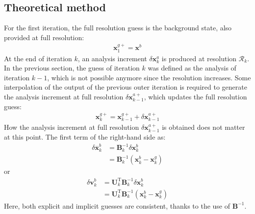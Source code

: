 \documentclass[12pt]{scrartcl}
\begin{document}
\subsection{Theoretical method}
For the first iteration, the full resolution guess is the background state, also provided at full resolution:
\begin{align}
\label{eq:usual_full_res_first}
\mathbf{x}^{g+}_1 = \mathbf{x}^b
\end{align}
At the end of iteration $k$, an analysis increment $\delta \mathbf{x}^a_k$ is produced at resolution $\mathcal{R}_k$. In the previous section, the guess of iteration $k$ was defined as the analysis of iteration $k-1$, which is not possible anymore since the resolution increases. Some interpolation of the output of the previous outer iteration is required to generate the analysis increment at full resolution $\delta \mathbf{x}^{a+}_{k-1}$, which updates the full resolution guess:
\begin{align}
\label{eq:usual_full_res_next}
\mathbf{x}^{g+}_k = \mathbf{x}^{g+}_{k-1} + \delta \mathbf{x}^{a+}_{k-1}
\end{align}
How the analysis increment at full resolution $\delta \mathbf{x}^{a+}_{k-1}$ is obtained does not matter at this point. The first term of the right-hand side as:
\begin{align}
\label{eq:correct_dxb}
\delta \overline{\mathbf{x}}^b_k & = \mathbf{B}^{-1}_k \delta \mathbf{x}^b_k \nonumber \\
& = \mathbf{B}^{-1}_k \left(\mathbf{x}^b_k - \mathbf{x}^g_k\right)
\end{align}
or
\begin{align}
\label{eq:correct_dvb}
\delta \mathbf{v}^b_k & = \mathbf{U}_k^\mathrm{T} \mathbf{B}^{-1}_k \delta \mathbf{x}^b_k \nonumber \\
& = \mathbf{U}_k^\mathrm{T} \mathbf{B}^{-1}_k \left(\mathbf{x}^b_k - \mathbf{x}^g_k\right)
\end{align}
Here, both explicit and implicit guesses are consistent, thanks to the use of $\mathbf{B}^{-1}$.
\end{document}
